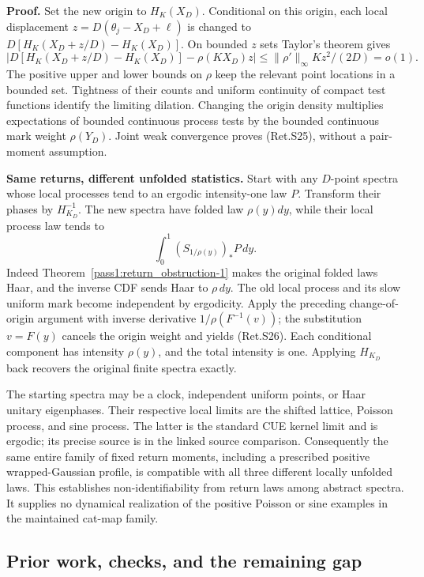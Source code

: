 \textbf{Proof.} Set the new origin to \(H_K(X_D)\). Conditional on this origin,
each local displacement \(z=D(\theta_j-X_D+\ell)\) is changed to
\(D[H_K(X_D+z/D)-H_K(X_D)]\). On bounded \(z\) sets Taylor's theorem gives
\[
 \left|D[H_K(X_D+z/D)-H_K(X_D)]-\rho(KX_D)z\right|
             \le\|\rho'\|_\infty K z^2/(2D)=o(1).
\]
The positive upper and lower bounds on \(\rho\) keep the relevant point
locations in a bounded set. Tightness of their counts and uniform continuity
of compact test functions identify the limiting dilation.
Changing the origin density multiplies expectations of bounded continuous
process tests by the bounded continuous mark weight \(\rho(Y_D)\).
Joint weak convergence proves (Ret.S25), without a pair-moment assumption.

\textbf{Same returns, different unfolded statistics.} Start with any \(D\)-point
spectra whose local processes tend to an ergodic intensity-one law \(P\).
Transform their phases by \(H_{K_D}^{-1}\). The new spectra have folded
law \(\rho(y)dy\), while their local process law tends to
\[
                   \int_0^1(S_{1/\rho(y)})_*P\,dy.              \tag{Ret.S26}
\]
Indeed Theorem~\ref{pass1:return_obstruction-1} makes the original folded laws Haar, and the inverse CDF
sends Haar to \(\rho\,dy\). The old local process and its slow uniform mark
become independent by ergodicity. Apply the preceding change-of-origin
argument with inverse derivative \(1/\rho(F^{-1}(v))\); the substitution
\(v=F(y)\) cancels the origin weight and yields (Ret.S26).
Each conditional component has intensity \(\rho(y)\), and the total intensity
is one. Applying \(H_{K_D}\) back recovers the original finite spectra exactly.

The starting spectra may be a clock, independent uniform points, or Haar
unitary eigenphases. Their respective local limits are the shifted lattice,
Poisson process, and sine process. The latter is the standard CUE kernel
limit and is ergodic; its precise source is in the linked source comparison.
Consequently the same entire family of fixed return moments, including a
prescribed positive wrapped-Gaussian profile, is compatible with all three
different locally unfolded laws. This establishes non-identifiability from
return laws among abstract spectra. It supplies no dynamical realization of
the positive Poisson or sine examples in the maintained cat-map family.

\hypertarget{prior-work-checks-and-the-remaining-gap}{%
\subsection{Prior work, checks, and the remaining gap}\label{prior-work-checks-and-the-remaining-gap}}


